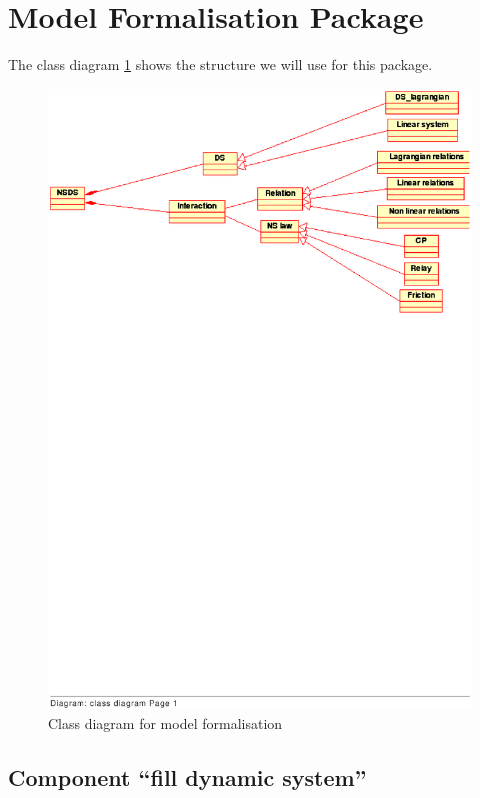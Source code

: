 	
\section{Model Formalisation Package}
	The class diagram \ref{fig: Class diagram for model formalisation} shows the structure we will use for this package.
	
	\begin{figure}
	\begin{center}
	\includegraphics[scale=0.85, bb=20 500 560 830, clip]{figure/class_formalisation.ps}
	\caption{Class diagram for model formalisation}
	\label{fig: Class diagram for model formalisation}
	\end{center}
	\end{figure}


	\subsection{Component ``fill dynamic system''}	
	

